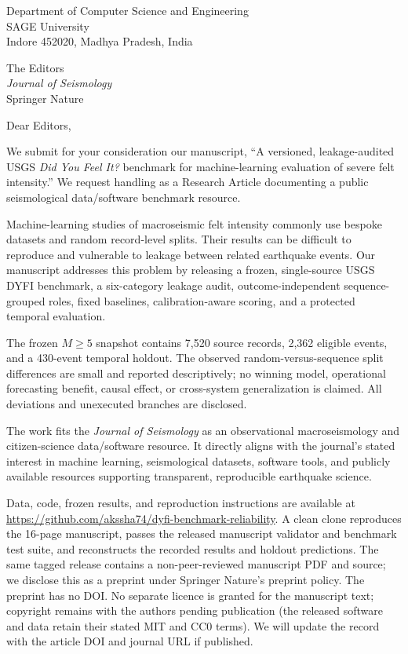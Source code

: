 \documentclass[10pt]{article}
\begin{document}
\raggedright

\begin{flushright}
Department of Computer Science and Engineering\\
SAGE University\\
Indore 452020, Madhya Pradesh, India
\end{flushright}

The Editors\\
\emph{Journal of Seismology}\\
Springer Nature

\medskip
Dear Editors,

We submit for your consideration our manuscript, ``A versioned,
leakage-audited USGS \emph{Did You Feel It?} benchmark for machine-learning
evaluation of severe felt intensity.'' We request handling as a Research Article
documenting a public seismological data/software benchmark resource.

Machine-learning studies of macroseismic felt intensity commonly use bespoke
datasets and random record-level splits. Their results can be difficult to
reproduce and vulnerable to leakage between related earthquake events. Our
manuscript addresses this problem by releasing a frozen, single-source USGS
DYFI benchmark, a six-category leakage audit, outcome-independent
sequence-grouped roles, fixed baselines, calibration-aware scoring, and a
protected temporal evaluation.

The frozen \(M\geq5\) snapshot contains 7,520 source records, 2,362 eligible
events, and a 430-event temporal holdout. The observed random-versus-sequence
split differences are small and reported descriptively; no winning model,
operational forecasting benefit, causal effect, or cross-system generalization
is claimed. All deviations and unexecuted branches are disclosed.

The work fits the \emph{Journal of Seismology} as an observational
macroseismology and citizen-science data/software resource. It directly aligns
with the journal's stated interest in machine learning, seismological datasets,
software tools, and publicly available resources supporting transparent,
reproducible earthquake science.

Data, code, frozen results, and reproduction instructions are available at
\url{https://github.com/akssha74/dyfi-benchmark-reliability}. A clean clone
reproduces the 16-page manuscript, passes the released manuscript validator and
benchmark test suite, and reconstructs the recorded results and holdout predictions.
The same tagged release contains a non-peer-reviewed manuscript PDF and source;
we disclose this as a preprint under Springer Nature's preprint policy. The
preprint has no DOI. No separate licence is granted for the manuscript text;
copyright remains with the authors pending publication (the released software
and data retain their stated MIT and CC0 terms). We will update the record with
the article DOI and journal URL if published.
\end{document}
